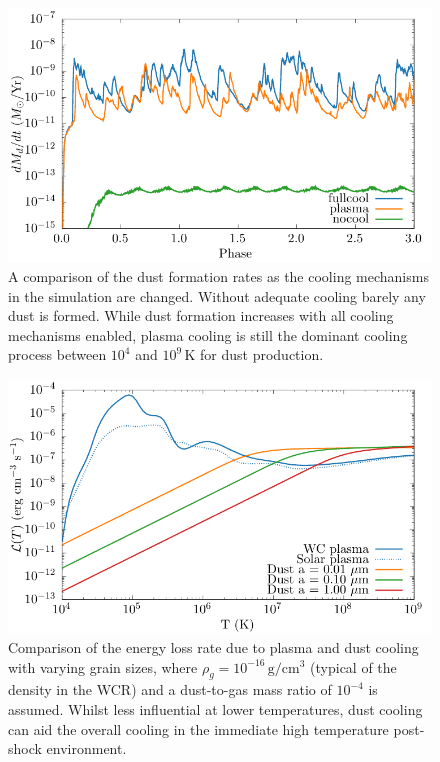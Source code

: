 \documentclass[fleqn,usenatbib]{mnras}
\begin{document}
\begin{figure}
  \centering
  \includegraphics[width=\linewidth]{assets/cool-phase-dust_rate.pdf}
  \caption[Comparison of dust formation rates with cooling methods]{A comparison of the dust formation rates as the cooling mechanisms in the simulation are changed. Without adequate cooling barely any dust is formed. While dust formation increases with all cooling mechanisms enabled, plasma cooling is still the dominant cooling process between $10^4$ and $10^9 \, \si{\kelvin}$ for dust production.}
  \label{fig:coolingprocess-dustproduction}
\end{figure}

\begin{figure}
  \centering
  \includegraphics[width=\linewidth]{assets/dust-plasma-cooling-comparison/cooling-comparison-forpaper2.pdf}
  \caption[Comparison of dust and plasma cooling rates in post-shock environment]{Comparison of the energy loss rate due to plasma and dust cooling with varying grain sizes, where $\rho_g = 10^{-16} \, \si{\gram\per\centi\metre\cubed}$ (typical of the density in the WCR) and a dust-to-gas mass ratio of $10^{-4}$ is assumed. Whilst less influential at lower temperatures, dust cooling can aid the overall cooling in the immediate high temperature post-shock environment.}
  \label{fig:postshockcoolcomparison}
\end{figure}
\end{document}
